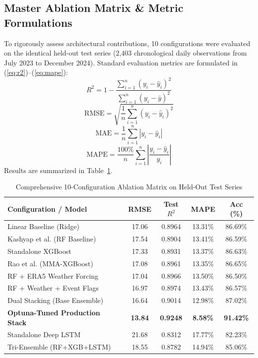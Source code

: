 \documentclass[conference]{IEEEtran}
\begin{document}
\subsection{Master Ablation Matrix \& Metric Formulations}
To rigorously assess architectural contributions, 10 configurations were evaluated on the identical held-out test series (2,403 chronological daily observations from July 2023 to December 2024). Standard evaluation metrics are formulated in (\ref{eq:r2})--(\ref{eq:mape}):
\begin{equation}
\label{eq:r2}
R^2 = 1 - \frac{\sum_{i=1}^n (y_i - \hat{y}_i)^2}{\sum_{i=1}^n (y_i - \bar{y})^2}
\end{equation}
\begin{equation}
\label{eq:rmse}
\text{RMSE} = \sqrt{\frac{1}{n}\sum_{i=1}^n (y_i - \hat{y}_i)^2}
\end{equation}
\begin{equation}
\label{eq:mae}
\text{MAE} = \frac{1}{n}\sum_{i=1}^n |y_i - \hat{y}_i|
\end{equation}
\begin{equation}
\label{eq:mape}
\text{MAPE} = \frac{100\%}{n}\sum_{i=1}^n \left| \frac{y_i - \hat{y}_i}{y_i} \right|
\end{equation}
Results are summarized in Table~\ref{tab:ablation}.

\begin{table}[t]
\caption{Comprehensive 10-Configuration Ablation Matrix on Held-Out Test Series}
\label{tab:ablation}
\centering
\begin{tabular}{lcccc}
\toprule
\textbf{Configuration / Model} & \textbf{RMSE} & \textbf{Test $R^2$} & \textbf{MAPE} & \textbf{Acc (\%)} \\
\midrule
Linear Baseline (Ridge) & 17.06 & 0.8964 & 13.31\% & 86.69\% \\
Kashyap et al. (RF Baseline) \cite{kashyap2023} & 17.54 & 0.8904 & 13.41\% & 86.59\% \\
Standalone XGBoost & 17.33 & 0.8931 & 13.37\% & 86.63\% \\
Rao et al. (MMA-XGBoost) \cite{rao2023} & 17.08 & 0.8961 & 13.35\% & 86.65\% \\
RF + ERA5 Weather Forcing & 17.04 & 0.8966 & 13.50\% & 86.50\% \\
RF + Weather + Event Flags & 16.97 & 0.8974 & 13.43\% & 86.57\% \\
Dual Stacking (Base Ensemble) & 16.64 & 0.9014 & 12.98\% & 87.02\% \\
\textbf{Optuna-Tuned Production Stack} & \textbf{13.84} & \textbf{0.9248} & \textbf{8.58\%} & \textbf{91.42\%} \\
Standalone Deep LSTM & 21.68 & 0.8312 & 17.77\% & 82.23\% \\
Tri-Ensemble (RF+XGB+LSTM) & 18.55 & 0.8782 & 14.94\% & 85.06\% \\
\bottomrule
\end{tabular}
\end{table}
\end{document}
